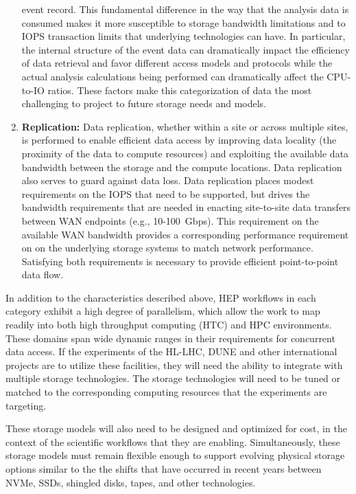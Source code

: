 \documentclass[12pt,a4paper]{article}
\begin{document}
\begin{enumerate}
  event record. This fundamental difference in the way that the analysis
  data is consumed makes it more susceptible to storage bandwidth
  limitations and to IOPS transaction limits that underlying
  technologies can have. In particular, the internal structure of the
  event data can dramatically impact the efficiency of data retrieval
  and favor different access models and protocols while the actual analysis calculations being performed can
  dramatically affect the CPU-to-IO ratios. These factors make this
  categorization of data the most challenging to project to future
  storage needs and models.
\item \textbf{Replication:} Data replication, whether within a site or
  across multiple sites, is performed to enable efficient data access by
  improving data locality (the proximity of the data to compute
  resources) and exploiting the available data bandwidth between the
  storage and the compute locations. Data replication also serves to
  guard against data loss. Data replication places modest requirements
  on the IOPS that need to be supported, but drives
  the bandwidth requirements that are needed in enacting site-to-site
  data transfers between WAN endpoints (e.g., 10-100~Gbps). This
  requirement on the available WAN bandwidth provides a corresponding
  performance requirement on on the underlying storage systems to match
  network performance. Satisfying both requirements is necessary to
  provide efficient point-to-point data flow.
\end{enumerate}

In addition to the characteristics described above, HEP workflows in
each category exhibit a high degree of parallelism, which allow the work
to map readily into both high throughput computing (HTC) and HPC environments. These domains span wide
dynamic ranges in their requirements for concurrent data access. If the
experiments of the HL-LHC, DUNE and other international projects
are to utilize these facilities, they will need the ability to integrate
with multiple storage technologies. The storage technologies will need
to be tuned or matched to the corresponding computing resources that the
experiments are targeting.

These storage models will also need to be designed and optimized for
cost, in the context of the scientific workflows that they are enabling.
Simultaneously, these storage models must remain flexible enough to
support evolving physical storage options similar to the the shifts that
have occurred in recent years between NVMe, SSDs, shingled disks, tapes,
and other technologies.
\end{document}

